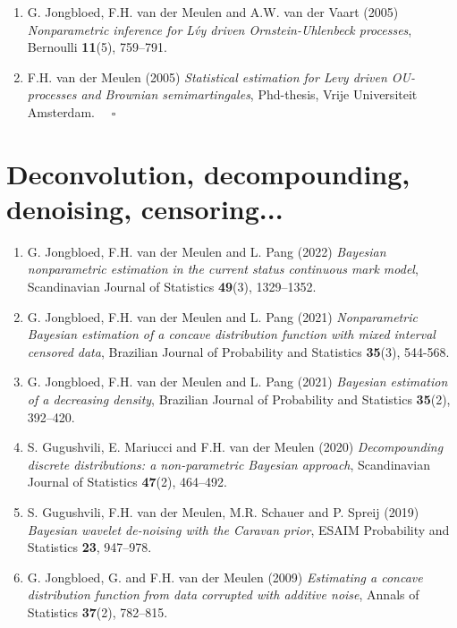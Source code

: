 \documentclass[
10pt, %
a4paper, %
oneside, %
headinclude,footinclude, %
BCOR5mm, %
]{scrartcl}
\begin{document}
\begin{enumerate}
\item {\sc G. Jongbloed, F.H. van der Meulen and A.W. van der Vaart (2005)} {\it   Nonparametric inference for L\'vy driven Ornstein-Uhlenbeck processes}, Bernoulli {\bf 11}(5), 759--791.

\item {\sc F.H. van der Meulen (2005)} {\it  Statistical estimation for Levy driven OU-processes and Brownian semimartingales}, Phd-thesis, Vrije Universiteit Amsterdam.\hspace*{\fill}  $\quad \square$
\end{enumerate}

\section{Deconvolution, decompounding, denoising, censoring...}

\begin{enumerate}

\item {\sc G. Jongbloed, F.H. van der Meulen and L. Pang (2022)} {\it  Bayesian nonparametric estimation in the current status continuous mark model}, Scandinavian Journal of Statistics {\bf 49}(3), 1329--1352.




\item {\sc G. Jongbloed, F.H. van der Meulen and L. Pang (2021)} {\it  Nonparametric Bayesian estimation of a concave distribution function with mixed interval censored data},  Brazilian Journal of Probability and Statistics {\bf 35}(3), 544-568.
\item {\sc G. Jongbloed, F.H. van der Meulen and L. Pang (2021)} {\it  Bayesian estimation of a decreasing density}, Brazilian Journal of Probability and Statistics {\bf  35}(2), 392--420.

\item {\sc S. Gugushvili, E. Mariucci and F.H. van der Meulen (2020)} {\it  Decompounding discrete distributions: a non-parametric Bayesian approach}, Scandinavian Journal of Statistics {\bf 47}(2), 464--492.

\item {\sc S. Gugushvili, F.H. van der Meulen, M.R. Schauer and P. Spreij (2019)} {\it  Bayesian wavelet de-noising with the Caravan prior}, ESAIM Probability and Statistics {\bf 23}, 947--978.

\item {\sc G. Jongbloed, G. and F.H. van der Meulen (2009)} {\it  Estimating a concave distribution function from data corrupted with additive noise},  Annals of Statistics {\bf 37}(2), 782--815. 

\end{enumerate}
\end{document}
